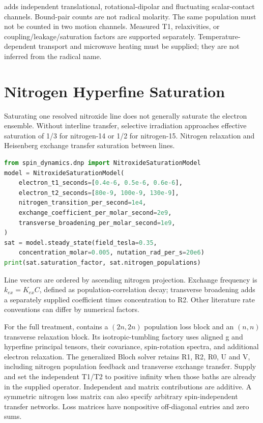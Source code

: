  adds independent translational, rotational-dipolar
and fluctuating scalar-contact channels. Bound-pair counts are not radical
molarity. The same population must not be counted in two motion channels.
Measured T1, relaxivities, or coupling/leakage/saturation factors are supported
separately. Temperature-dependent transport and microwave heating must be
supplied; they are not inferred from the radical name.

\section{Nitrogen Hyperfine Saturation}

Saturating one resolved nitroxide line does not generally saturate the electron
ensemble. Without interline transfer, selective irradiation approaches effective
saturation of 1/3 for nitrogen-14 or 1/2 for nitrogen-15. Nitrogen relaxation and
Heisenberg exchange transfer saturation between lines.

\begin{lstlisting}[language=Python]
from spin_dynamics.dnp import NitroxideSaturationModel
model = NitroxideSaturationModel(
    electron_t1_seconds=[0.4e-6, 0.5e-6, 0.6e-6],
    electron_t2_seconds=[80e-9, 100e-9, 130e-9],
    nitrogen_transition_per_second=1e4,
    exchange_coefficient_per_molar_second=2e9,
    transverse_broadening_per_molar_second=1e9,
)
sat = model.steady_state(field_tesla=0.35,
    concentration_molar=0.005, nutation_rad_per_s=20e6)
print(sat.saturation_factor, sat.nitrogen_populations)
\end{lstlisting}

Line vectors are ordered by ascending nitrogen projection. Exchange frequency
is \(k_{ex}=K_{ex}C\), defined as population-correlation decay; transverse
broadening adds a separately supplied coefficient times concentration to R2.
Other literature rate conventions can differ by numerical factors.

For the full treatment,  contains a
\((2n,2n)\) population loss block and an \((n,n)\) transverse relaxation block.
Its isotropic-tumbling factory uses aligned g and hyperfine principal tensors,
their covariance, spin-rotation spectra, and additional electron relaxation.
The generalized Bloch solver retains R1, R2, R0, U and V, including nitrogen
population feedback and transverse exchange transfer. Supply
 and set the independent T1/T2 to positive infinity
when those baths are already in the supplied operator. Independent and matrix
contributions are additive. A symmetric nitrogen loss matrix can also specify
arbitrary spin-independent transfer networks. Loss matrices have nonpositive
off-diagonal entries and zero sums.


